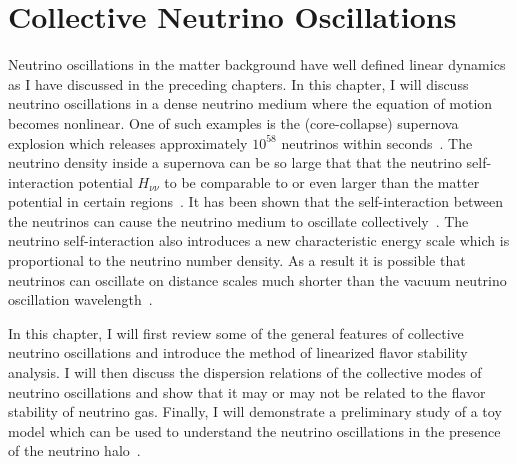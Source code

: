 
\chapter{\label{chap:collective}Collective Neutrino Oscillations}

Neutrino oscillations in the matter background have well defined linear dynamics as I  have discussed in the preceding chapters. In this chapter, I will discuss neutrino oscillations in a dense neutrino medium where the equation of motion becomes nonlinear.
One of such examples is the (core-collapse) supernova explosion which releases approximately $10^{58}$ neutrinos within seconds~\cite{Bahcall1987}. The neutrino density inside a supernova can be so large that that the neutrino self-interaction potential $H_{\nu\nu}$ to be comparable to or even larger than the matter potential in certain regions~\cite{Flowers1976a}. It has been shown that the self-interaction between the neutrinos can cause the neutrino medium to oscillate collectively~\cite{Duan2010, Duan2006}. The neutrino self-interaction also introduces a new characteristic energy scale which is proportional to the neutrino number density. As a result it is possible that neutrinos can oscillate on distance scales much shorter than the vacuum neutrino oscillation wavelength~\cite{Sawyer2016,Chakraborty2016}.

In this chapter, I will first review some of the general features of collective neutrino oscillations and introduce the method of linearized flavor stability analysis. I will then discuss the dispersion relations of the collective modes of neutrino oscillations and show that it may or may not be related to the flavor stability of neutrino gas. Finally, I will demonstrate a preliminary study of a toy model which can be used to understand the neutrino oscillations in the presence of the neutrino halo~\cite{Sarikas2012a,Cherry2012}.


